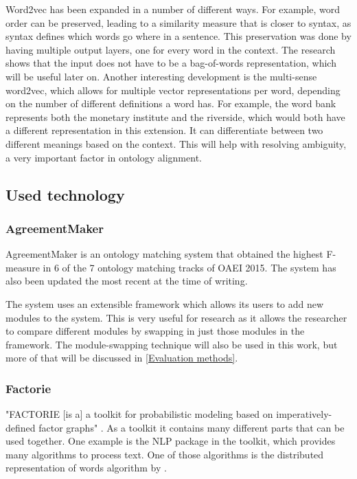 \documentclass{article}
\begin{document}
 Word2vec has been expanded in a number of different ways. For example, word order can be preserved, leading to a similarity measure that is closer to syntax, as syntax defines which words go where in a sentence. This preservation was done by having multiple output layers, one for every word in the context. The research shows that the input does not have to be a bag-of-words representation, which will be useful later on. \cite{ling2015}
 Another interesting development is the multi-sense word2vec, which allows for multiple vector representations per word, depending on the number of different definitions a word has. For example, the word bank represents both the monetary institute and the riverside, which would both have a different representation in this extension. It can differentiate between two different meanings based on the context. This will help with resolving ambiguity, a very important factor in ontology alignment.\cite{multisense}
 \subsection{Used technology}
 \subsubsection{AgreementMaker} \label{agreementmaker}
 AgreementMaker is an ontology matching system that obtained the highest F-measure in 6 of the 7 ontology matching tracks of OAEI 2015. \cite{OAEI2015} The system has also been updated the most recent at the time of writing\cite{agreementmaker}.
 
 The system uses an extensible framework which allows its users to add new modules to the system. This is very useful for research as it allows the researcher to compare different modules by swapping in just those modules in the framework. The module-swapping technique will also be used in this work, but more of that will be discussed in \ref{Evaluation methods}.
 
 \subsubsection{Factorie} \label{factorie}
 "FACTORIE [is a] a toolkit for probabilistic modeling based on imperatively-defined factor graphs" \cite{git-factorie}. As a toolkit it contains many different parts that can be used together. One example is the NLP package in the toolkit, which provides many algorithms to process text. One of those algorithms is the distributed representation of words algorithm by \cite{w2v}.
 
\end{document}
